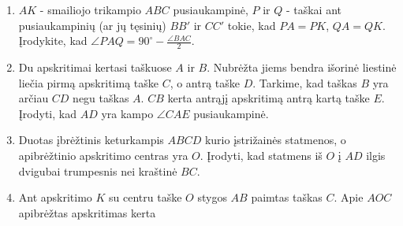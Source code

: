 \begin{enumerate}
  \item $AK$ - smailiojo trikampio $ABC$ pusiaukampinė, $P$ ir
    $Q$ - taškai ant pusiaukampinių (ar jų tęsinių) $BB'$ ir
    $CC'$ tokie, kad $PA=PK$, $QA=QK$. Įrodykite, kad $\angle
    PAQ= 90^\circ-\frac{\angle BAC}{2}$. 
  \item Du apskritimai kertasi taškuose $A$ ir $B$. Nubrėžta
    jiems bendra išorinė liestinė liečia pirmą apskritimą
    taške $C$, o antrą  taške $D$. Tarkime, kad taškas $B$ yra
    arčiau $CD$ negu taškas $A$. $CB$ kerta antrąjį apskritimą
    antrą kartą taške $E$. Įrodyti, kad $AD$ yra kampo $\angle
    CAE$ pusiaukampinė.  
  \item Duotas įbrėžtinis keturkampis $ABCD$ kurio įstrižainės 
    statmenos, o apibrėžtinio apskritimo centras yra $O$. 
    Įrodyti, kad statmens iš $O$ į $AD$ ilgis dvigubai trumpesnis
    nei kraštinė $BC$.
  \item Ant apskritimo $K$ su centru taške $O$ stygos $AB$
    paimtas taškas $C$. Apie $AOC$ apibrėžtas apskritimas kerta 

\end{enumerate}
